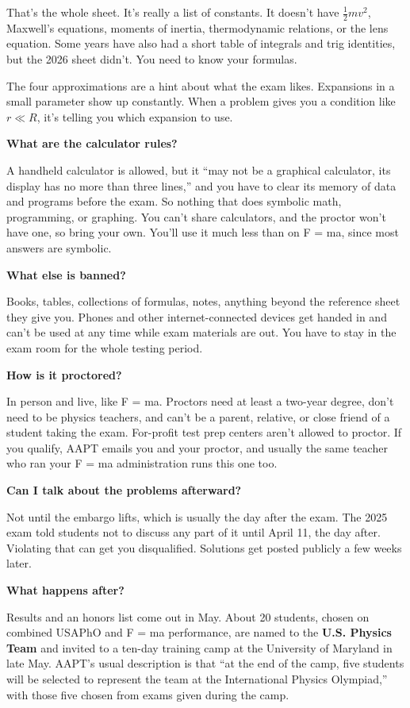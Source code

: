 \documentclass[11pt]{article}
\newcommand{\Q}[1]{\par\medskip\noindent\textbf{\color{qblue}#1}\par\nobreak\vspace{1pt}\nobreak}
\begin{document}
That's the whole sheet. It's really a list of constants. It doesn't have
$\tfrac{1}{2}mv^2$, Maxwell's equations, moments of inertia, thermodynamic relations, or
the lens equation. Some years have also had a short table of integrals and trig identities,
but the 2026 sheet didn't. You need to know your formulas.

The four approximations are a hint about what the exam likes. Expansions in a small
parameter show up constantly. When a problem gives you a condition like $r \ll R$, it's
telling you which expansion to use.

\Q{What are the calculator rules?}
A handheld calculator is allowed, but it ``may not be a graphical calculator, its display
has no more than three lines,'' and you have to clear its memory of data and programs before
the exam. So nothing that does symbolic math, programming, or graphing. You can't share
calculators, and the proctor won't have one, so bring your own. You'll use it much less than
on F = ma, since most answers are symbolic.

\Q{What else is banned?}
Books, tables, collections of formulas, notes, anything beyond the reference sheet they give
you. Phones and other internet-connected devices get handed in and can't be used at any time
while exam materials are out. You have to stay in the exam room for the whole testing
period.

\Q{How is it proctored?}
In person and live, like F = ma. Proctors need at least a two-year degree, don't need to be
physics teachers, and can't be a parent, relative, or close friend of a student taking the
exam. For-profit test prep centers aren't allowed to proctor. If you qualify, AAPT emails
you and your proctor, and usually the same teacher who ran your F = ma administration runs
this one too.

\Q{Can I talk about the problems afterward?}
Not until the embargo lifts, which is usually the day after the exam. The 2025 exam told
students not to discuss any part of it until April 11, the day after. Violating that can get
you disqualified. Solutions get posted publicly a few weeks later.

\Q{What happens after?}
Results and an honors list come out in May. About 20 students, chosen on combined USAPhO and
F = ma performance, are named to the \textbf{U.S. Physics Team} and invited to a ten-day
training camp at the University of Maryland in late May. AAPT's usual description is that
``at the end of the camp, five students will be selected to represent the team at the
International Physics Olympiad,'' with those five chosen from exams given during the camp.
\end{document}
